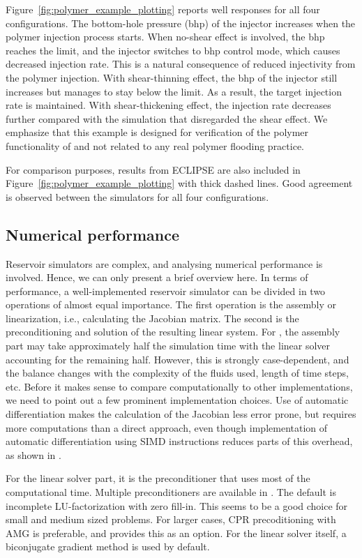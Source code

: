 Figure~\ref{fig:polymer_example_plotting} reports well responses for all four
configurations. The bottom-hole pressure (bhp) of the injector increases when the polymer
injection process starts. When no-shear effect is involved, the bhp reaches the limit, and
the injector switches to bhp control mode, which causes decreased injection rate. This is
a natural consequence of reduced injectivity from the polymer injection. With
shear-thinning effect, the bhp of the injector still increases but manages to stay below
the limit. As a result, the target injection rate is maintained. With shear-thickening
effect, the injection rate decreases further compared with the simulation that disregarded
the shear effect. We emphasize that this example is designed for verification of the
polymer functionality of \opm and not related to any real polymer flooding practice.

For comparison purposes, results from ECLIPSE are also
included in Figure~\ref{fig:polymer_example_plotting} with thick dashed lines.
Good agreement is observed between the simulators for all four configurations.

\subsection{Numerical performance}
Reservoir simulators are complex, and analysing numerical performance is involved.  Hence,
we can only present a brief overview here. In terms of performance, a well-implemented
reservoir simulator can be divided in two operations of almost equal importance. The first
{\revised operation } is the assembly or linearization, i.e., calculating the Jacobian matrix.  The second {\revised is
the preconditioning and solution of the resulting linear system.} For \opmflow, the assembly part may take
approximately half the simulation time with the linear solver accounting for the remaining
half. However, this is strongly case-dependent, and the balance changes with the
complexity of the fluids used, length of time steps, etc.  Before it makes sense to
compare \opmflow computationally to other implementations, we need to {\revised point out} a few
prominent implementation choices.  Use of automatic differentiation makes the calculation
of the Jacobian less error prone, but requires more computations than a direct approach,
even though implementation of automatic differentiation using SIMD instructions reduces
parts of this overhead, as shown in \cite{lauser2018local}.

For the linear {\revised solver part}, it is the preconditioner that uses most of the computational
time. Multiple preconditioners are available in \opmflow. The default is incomplete
LU-factorization with zero fill-in.  This seems to be a good choice for small and medium
sized problems. For larger cases, CPR precoditioning with AMG is preferable, and \opmflow
provides this as an option.  For the linear solver itself, a biconjugate gradient method
is used by default.

